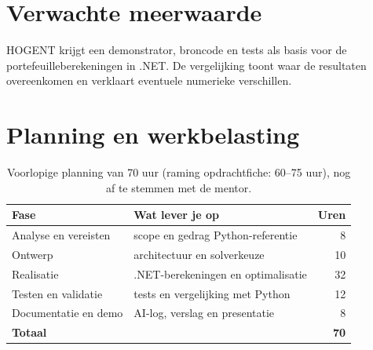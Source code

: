 
\section{Verwachte meerwaarde}%
\label{vst:meerwaarde}


HOGENT krijgt een demonstrator, broncode en tests als basis voor de
portefeuilleberekeningen in .NET. De vergelijking toont waar de resultaten
overeenkomen en verklaart eventuele numerieke verschillen.


\section{Planning en werkbelasting}%
\label{vst:planning}


\begin{table}[htbp]
  \centering
  \begin{tabularx}{\linewidth}{@{}>{\raggedright\arraybackslash}X>{\raggedright\arraybackslash}X r@{}}
    \toprule
    \textbf{Fase} & \textbf{Wat lever je op} & \textbf{Uren} \\
    \midrule
    Analyse en vereisten      & scope en gedrag Python-referentie       & 8   \\
    Ontwerp                   & architectuur en solverkeuze             & 10  \\
    Realisatie                & .NET-berekeningen en optimalisatie      & 32  \\
    Testen en validatie       & tests en vergelijking met Python        & 12  \\
    Documentatie en demo      & AI-log, verslag en presentatie          & 8   \\
    \midrule
    \textbf{Totaal}           &                              & \textbf{70} \\
    \bottomrule
  \end{tabularx}
  \caption[Planning en werkbelasting]{\label{tab:vst-planning}%
    Voorlopige planning van 70 uur (raming opdrachtfiche: 60--75 uur), nog af te stemmen met de mentor.}
\end{table}


